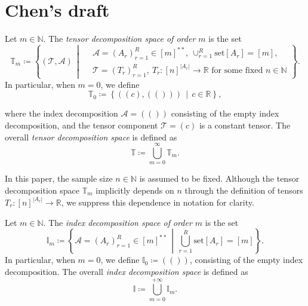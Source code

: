 \documentclass[letterpaper,11pt]{article}
\newcommand{\takesetp}[1]{\mathrm{set}[#1]}
\newcommand{\mytensorspace}{\mathbb{T}}
\newcommand{\mytensorspacep}[1]{\mathbb{T}_{#1}}
\newcommand{\myindexspace}{\mathbb{I}}
\newcommand{\myindexspacep}[1]{\mathbb{I}_{#1}}
\begin{document}
\section{Chen's draft}
\begin{definition}\label{def:tensor_decomp_space}
Let $m \in \mathbb{N}$. The \emph{tensor decomposition space of order $m$} is the set
\begin{equation}
\mytensorspacep{m} \coloneqq \left\{ (\mathcal{T}, \mathcal{A}) \,\middle|\, 
\begin{aligned}
    &\mathcal{A} = (A_r)_{r=1}^R \in [m]^{**},\ \cup_{r=1}^R \takesetp{A_r} = [m], \\
    &\mathcal{T} = (T_r)_{r=1}^R,\ T_r : [n]^{|A_r|} \to \mathbb{R} \text{ for some fixed } n \in \mathbb{N}
\end{aligned}
\right\}.
\end{equation}
In particular, when $m = 0$, we define
\begin{equation}
   \mytensorspacep{0} \coloneqq \left\{ ( ( c ), ( ( ) ) ) \,\middle|\, c \in \mathbb{R} \right\}, 
\end{equation}
\end{definition}

where the index decomposition $\mathcal{A} = (( ))$ consisting of the empty index decomposition, and the tensor component $\mathcal{T} = ( c )$ is a constant tensor. 
The overall \emph{tensor decomposition space} is defined as
\begin{equation}
\mytensorspace \coloneqq \bigcup_{m = 0}^{\infty} \mytensorspacep{m}.
\end{equation}



\begin{remark}
In this paper, the sample size $n \in \mathbb{N}$ is assumed to be fixed. Although the tensor decomposition space $\mytensorspacep{m}$ implicitly depends on $n$ through the definition of tensors $T_r : [n]^{|A_r|} \to \mathbb{R}$, we suppress this dependence in notation for clarity.
\end{remark}

\begin{definition}\label{def:index_decomp_space}
Let $m \in \mathbb{N}$. The \emph{index decomposition space of order $m$} is the set
\begin{equation}
\myindexspacep{m} \coloneqq \left\{ \mathcal{A} = (A_r)_{r=1}^R \in [m]^{**} \,\middle|\, \bigcup_{r=1}^R \takesetp{A_r} = [m] \right\}.
\end{equation}
In particular, when $m = 0$, we define $\myindexspacep{0} \coloneqq (( ))$, consisting of the empty index decomposition. The overall \emph{index decomposition space} is defined as
\begin{equation}
\myindexspace \coloneqq \bigcup_{m = 0}^{ + \infty} \myindexspacep{m}.
\end{equation}
\end{definition}
\end{document}
